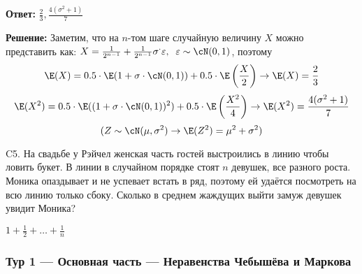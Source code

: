 \begin{enumerate}
\begin{problem}
\begin{sol}
\textbf{Ответ:} $\frac{2}{3},\frac{4(\sigma^2+1)}{7}$

\textbf{Решение:} Заметим, что на $n$-том шаге случайную величину $X$ можно представить как: $X = \frac{1}{2^{n-1}}+\frac{1}{2^{n-1}}\sigma^\cdot\varepsilon,\;\; \varepsilon\sim \cN(0,1)$, поэтому
\[
\E(X)= 0.5\cdot \E(1+\sigma\cdot \cN(0,1)) + 0.5\cdot \E\left(\frac{X}{2}\right)   \rightarrow \E(X)=\frac{2}{3}
\]
\[
\E(X^2)= 0.5\cdot \E((1+\sigma\cdot \cN(0,1))^2) + 0.5\cdot \E\left(\frac{X^2}{4}\right)
\rightarrow \E(X^2)=\frac{4(\sigma^2+1)}{7}
\]
\[
(Z\sim \cN(\mu,\sigma^2)\rightarrow \E(Z^2)=\mu^2 + \sigma^2)
\]
\end{sol}
\end{problem}


\begin{problem}
\item[C5.] На свадьбе у Рэйчел женская часть гостей выстроились в линию чтобы ловить букет. В линии в случайном порядке стоят $n$ девушек, все разного роста. Моника  опаздывает и не успевает встать в ряд, поэтому ей удаётся посмотреть на всю линию только сбоку. Сколько в среднем жаждущих выйти замуж девушек увидит Моника?

\begin{sol}
$1+\frac{1}{2}+\dots+\frac{1}{n}$
\end{sol}
\end{problem}
\end{enumerate}

\newpage
\subsubsection{Тур 1 — Основная часть — Неравенства Чебышёва и Маркова}


